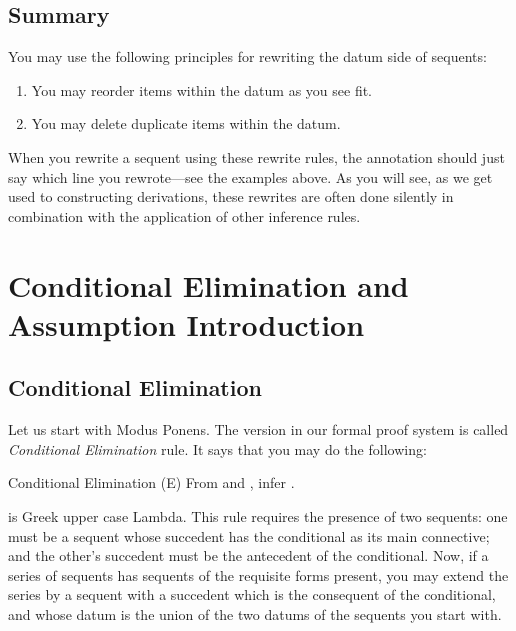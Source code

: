 \subsection{Summary}

You may use the following principles for rewriting the datum side of sequents:

\begin{enumerate}
 \renewcommand{\labelenumi}{\alph{enumi}.}
 
 \item You may reorder items within the datum as you see fit.

 \item You may delete duplicate items within the datum.
  

\end{enumerate}

When you rewrite a sequent using these rewrite rules, the annotation should just 
say which line you rewrote---see the examples above. As you will see, as we get 
used to constructing derivations, these rewrites are often  done silently in 
combination with the application of other inference rules.  





\section{Conditional Elimination and Assumption Introduction}

\subsection{Conditional Elimination}

Let us start with Modus Ponens. The version in our formal proof system is called 
\emph{Conditional Elimination} rule.  It says that you may do the following:

\begin{infrule}

 \item[Conditional Elimination (\p{\limplies}E)] From  and , infer .

\end{infrule}

\p{\Lambda} is  Greek upper case Lambda. This rule requires the presence of two 
sequents: one must be a sequent whose succedent has the conditional as its main 
connective; and the other's succedent must be the antecedent of the conditional.  
Now, if a series of sequents has sequents of the requisite  forms present, you 
may extend the series by a sequent with a succedent which is the consequent of 
the conditional, and whose datum is the union of the two datums of the sequents 
you start with.



